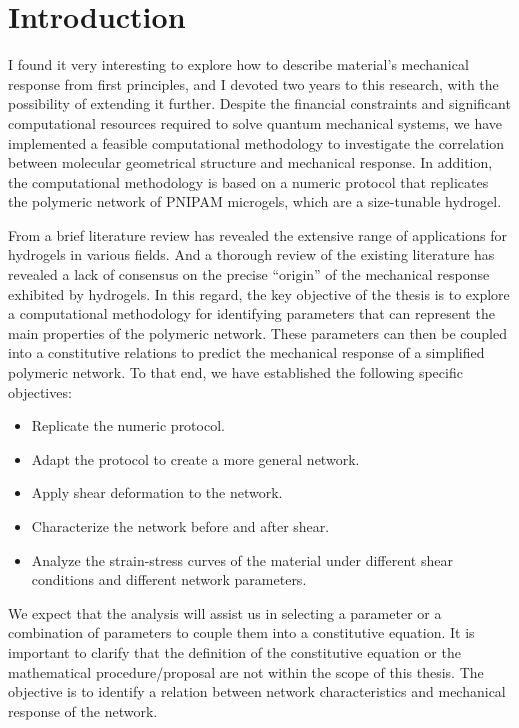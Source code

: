\chapter{Introduction}\label{ch1:Intro}



I found it very interesting to explore how to describe material's mechanical response from first principles, and I devoted two years to this research, with the possibility of extending it further.
Despite the financial constraints and significant computational resources required to solve quantum mechanical systems, we have implemented a feasible computational methodology to investigate the correlation between molecular geometrical structure and mechanical response.
In addition, the computational methodology is based on a numeric protocol that replicates the polymeric network of PNIPAM microgels, which are a size-tunable hydrogel.

From a brief literature review has revealed the extensive range of applications for hydrogels in various fields.
And a thorough review of the existing literature has revealed a lack of consensus on the precise ``origin'' of the mechanical response exhibited by hydrogels.
In this regard, the key objective of the thesis is to explore a computational methodology for identifying parameters that can represent the main properties of the polymeric network. 
These parameters can then be coupled into a constitutive relations to predict the mechanical response of a simplified polymeric network.
To that end, we have established the following specific objectives:
\begin{itemize}
    \item Replicate the numeric protocol.
    \item Adapt the protocol to create a more general network.
    \item Apply shear deformation to the network.
    \item Characterize the network before and after shear.
    \item Analyze the strain-stress curves of the material under different shear conditions and different network parameters.
\end{itemize}
We expect that the analysis will assist us in selecting a parameter or a combination of parameters to couple them into a constitutive equation.
It is important to clarify that the definition of the constitutive equation or the mathematical procedure/proposal are not within the scope of this thesis. 
The objective is to identify a relation between network characteristics and mechanical response of the network.

